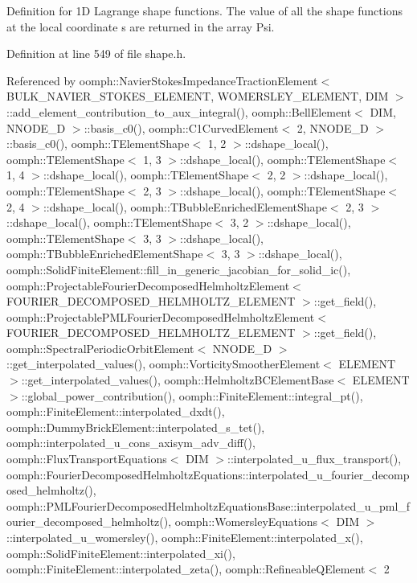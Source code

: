 Definition for 1D Lagrange shape functions. The value of all the shape functions at the local coordinate s are returned in the array Psi. 



Definition at line 549 of file shape.\+h.



Referenced by oomph\+::\+Navier\+Stokes\+Impedance\+Traction\+Element$<$ B\+U\+L\+K\+\_\+\+N\+A\+V\+I\+E\+R\+\_\+\+S\+T\+O\+K\+E\+S\+\_\+\+E\+L\+E\+M\+E\+N\+T, W\+O\+M\+E\+R\+S\+L\+E\+Y\+\_\+\+E\+L\+E\+M\+E\+N\+T, D\+I\+M $>$\+::add\+\_\+element\+\_\+contribution\+\_\+to\+\_\+aux\+\_\+integral(), oomph\+::\+Bell\+Element$<$ D\+I\+M, N\+N\+O\+D\+E\+\_\+D $>$\+::basis\+\_\+c0(), oomph\+::\+C1\+Curved\+Element$<$ 2, N\+N\+O\+D\+E\+\_\+D $>$\+::basis\+\_\+c0(), oomph\+::\+T\+Element\+Shape$<$ 1, 2 $>$\+::dshape\+\_\+local(), oomph\+::\+T\+Element\+Shape$<$ 1, 3 $>$\+::dshape\+\_\+local(), oomph\+::\+T\+Element\+Shape$<$ 1, 4 $>$\+::dshape\+\_\+local(), oomph\+::\+T\+Element\+Shape$<$ 2, 2 $>$\+::dshape\+\_\+local(), oomph\+::\+T\+Element\+Shape$<$ 2, 3 $>$\+::dshape\+\_\+local(), oomph\+::\+T\+Element\+Shape$<$ 2, 4 $>$\+::dshape\+\_\+local(), oomph\+::\+T\+Bubble\+Enriched\+Element\+Shape$<$ 2, 3 $>$\+::dshape\+\_\+local(), oomph\+::\+T\+Element\+Shape$<$ 3, 2 $>$\+::dshape\+\_\+local(), oomph\+::\+T\+Element\+Shape$<$ 3, 3 $>$\+::dshape\+\_\+local(), oomph\+::\+T\+Bubble\+Enriched\+Element\+Shape$<$ 3, 3 $>$\+::dshape\+\_\+local(), oomph\+::\+Solid\+Finite\+Element\+::fill\+\_\+in\+\_\+generic\+\_\+jacobian\+\_\+for\+\_\+solid\+\_\+ic(), oomph\+::\+Projectable\+Fourier\+Decomposed\+Helmholtz\+Element$<$ F\+O\+U\+R\+I\+E\+R\+\_\+\+D\+E\+C\+O\+M\+P\+O\+S\+E\+D\+\_\+\+H\+E\+L\+M\+H\+O\+L\+T\+Z\+\_\+\+E\+L\+E\+M\+E\+N\+T $>$\+::get\+\_\+field(), oomph\+::\+Projectable\+P\+M\+L\+Fourier\+Decomposed\+Helmholtz\+Element$<$ F\+O\+U\+R\+I\+E\+R\+\_\+\+D\+E\+C\+O\+M\+P\+O\+S\+E\+D\+\_\+\+H\+E\+L\+M\+H\+O\+L\+T\+Z\+\_\+\+E\+L\+E\+M\+E\+N\+T $>$\+::get\+\_\+field(), oomph\+::\+Spectral\+Periodic\+Orbit\+Element$<$ N\+N\+O\+D\+E\+\_\+D $>$\+::get\+\_\+interpolated\+\_\+values(), oomph\+::\+Vorticity\+Smoother\+Element$<$ E\+L\+E\+M\+E\+N\+T $>$\+::get\+\_\+interpolated\+\_\+values(), oomph\+::\+Helmholtz\+B\+C\+Element\+Base$<$ E\+L\+E\+M\+E\+N\+T $>$\+::global\+\_\+power\+\_\+contribution(), oomph\+::\+Finite\+Element\+::integral\+\_\+pt(), oomph\+::\+Finite\+Element\+::interpolated\+\_\+dxdt(), oomph\+::\+Dummy\+Brick\+Element\+::interpolated\+\_\+s\+\_\+tet(), oomph\+::interpolated\+\_\+u\+\_\+cons\+\_\+axisym\+\_\+adv\+\_\+diff(), oomph\+::\+Flux\+Transport\+Equations$<$ D\+I\+M $>$\+::interpolated\+\_\+u\+\_\+flux\+\_\+transport(), oomph\+::\+Fourier\+Decomposed\+Helmholtz\+Equations\+::interpolated\+\_\+u\+\_\+fourier\+\_\+decomposed\+\_\+helmholtz(), oomph\+::\+P\+M\+L\+Fourier\+Decomposed\+Helmholtz\+Equations\+Base\+::interpolated\+\_\+u\+\_\+pml\+\_\+fourier\+\_\+decomposed\+\_\+helmholtz(), oomph\+::\+Womersley\+Equations$<$ D\+I\+M $>$\+::interpolated\+\_\+u\+\_\+womersley(), oomph\+::\+Finite\+Element\+::interpolated\+\_\+x(), oomph\+::\+Solid\+Finite\+Element\+::interpolated\+\_\+xi(), oomph\+::\+Finite\+Element\+::interpolated\+\_\+zeta(), oomph\+::\+Refineable\+Q\+Element$<$ 2 